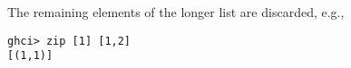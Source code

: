 
The remaining elements of the longer list are discarded, e.g., 
\begin{verbatim}
ghci> zip [1] [1,2]
[(1,1)]
\end{verbatim}
